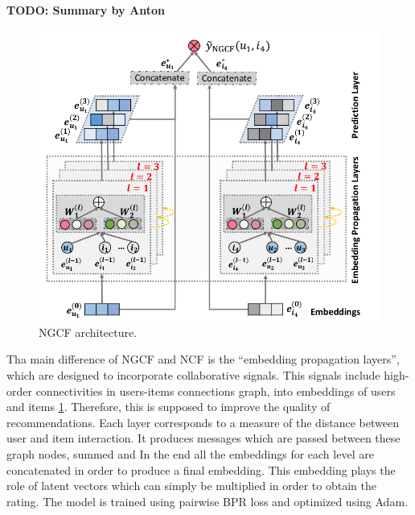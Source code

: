 \textbf{TODO: Summary by Anton}
\begin{figure}[h]
    \centering
    \includegraphics[width=0.8\linewidth]{images/ngcf.png}
    \caption{NGCF architecture.}
    \label{fig:ngcf}
\end{figure}

Tha main difference of NGCF \cite{wang2019neural} and NCF is the ``embedding propagation layers'', which are 
designed to incorporate collaborative signals.
This signals include high-order connectivities in users-items connections graph, into embeddings of users and items \ref{fig:ngcf}.
Therefore, this is supposed to improve the quality of recommendations. 
Each layer corresponds to a measure of the distance between user and item interaction.
It produces messages which are passed between these graph nodes, summed and
In the end all the embeddings for each level are concatenated in order to produce a final embedding.
This embedding plays the role of latent vectors which can simply be multiplied in order to obtain the rating.
The model is trained using pairwise BPR loss and optimized using Adam.